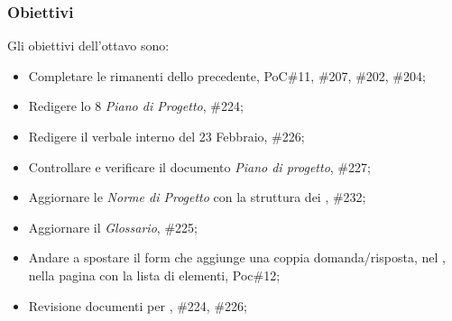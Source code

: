 \subsubsection{Obiettivi}
\label{sec:sprint8_obiettivi}
Gli obiettivi dell'ottavo  sono:
\begin{itemize}
    \item Completare le  rimanenti dello  precedente,  PoC\#11, \#207, \#202, \#204;
    \item Redigere lo  8 \textit{Piano di Progetto},  \#224;
    \item Redigere il verbale interno del 23 Febbraio,  \#226;
    \item Controllare e verificare il documento \textit{Piano di progetto},  \#227;
        \item Aggiornare le \textit{Norme di Progetto} con la struttura dei ,  \#232;
    \item Aggiornare il \textit{Glossario},  \#225;
    \item Andare a spostare il form che aggiunge una coppia domanda/risposta, nel , nella pagina con la lista di elementi,  Poc\#12;
    \item Revisione documenti per ,  \#224, \#226;
\end{itemize}